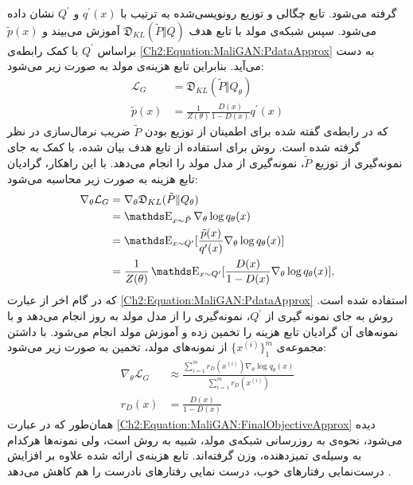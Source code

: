   گرفته می‌شود. 
تابع چگالی و توزیع رونویسی‌شده به ترتیب با
 $q^\prime (x)$
 و
  $Q^\prime$
  نشان داده می‌شود. سپس شبکه‌ی مولد با تابع هدف
  $\mathfrak{D}_{KL}(\tilde{P} \Vert Q)$
   آموزش می‌بیند و 
  $\tilde{p}(x)$
براساس
   $Q^{\prime}$
   با کمک رابطه‌ی 
   \ref{Ch2:Equation:MaliGAN:PdataApprox}
   به دست می‌آید. بنابراین تابع هزینه‌ی مولد به صورت زیر می‌شود:
\begin{equation}
\begin{split}
\mathcal{L}_G &= \mathfrak{D}_{KL}(\tilde{P} \Vert Q_\theta)\\
\tilde{p}(x)&=\frac{1}{Z(\theta)} \frac{D(x)}{1-D(x)} q^\prime(x)
\end{split}
\end{equation}
که در رابطه‌ی گفته شده برای اطمینان از توزیع بودن $\tilde{P}$ ضریب نرمال‌سازی در نظر گرفته شده است. 
\newline
روش
برای استفاده از تابع هدف بیان شده، با کمک
به جای نمونه‌گیری از توزیع
$\tilde{P}$،
نمونه‌گیری از مدل مولد را انجام می‌دهد. با این راهکار، گرادیان تابع هزینه به صورت زیر محاسبه می‌شود:
\begin{equation}\label{Ch2:Equation:MaliGAN:FinalObjective}
\begin{split}
\nabla_\theta \mathcal{L}_G &= \nabla_\theta \mathfrak{D}_{KL}(\tilde{P} \Vert Q_\theta) \\
&= \ME_{x \sim \tilde{P}} \nabla_\theta \log q_\theta(x) \\
&= \ME_{x \sim Q^\prime}[\frac{\tilde{p}(x)}{q^\prime(x)} \nabla_\theta \log q_\theta(x)] \\
&= \frac{1}{Z(\theta)} \ME_{x \sim Q^\prime} [\frac{D(x)}{1-D(x)} \nabla_\theta \log q_\theta(x)],
\end{split}
\end{equation}
که در گام اخر از عبارت
\ref{Ch2:Equation:MaliGAN:PdataApprox}
استفاده شده است. روش
 به جای نمونه گیری از 
$Q^\prime$،
نمونه‌گیری را از مدل مولد به روز انجام می‌دهد و با نمونه‌های آن گرادیان تابع هزینه را تخمین زده و آموزش مولد انجام می‌شود.
\newline
با داشتن مجموعه‌ی 
$\{ x^{(i)}  \}_1^m$
از نمونه‌های مولد، تخمین به صورت زیر می‌شود:
\begin{equation}\label{Ch2:Equation:MaliGAN:FinalObjectiveApprox}
\begin{split}
\nabla_\theta \mathcal{L}_G &\approx \frac
{\sum_{i=1}^m r_D(x^{(i)}) \nabla_\theta \log q_\theta(x)}
{\sum_{i=1}^m r_D(x^{(i)})}  \\
r_D(x) &= \frac{D(x)}{1-D(x)}
\end{split}
\end{equation}
همان‌طور که در عبارت
\ref{Ch2:Equation:MaliGAN:FinalObjectiveApprox}
دیده می‌شود، نحوه‌ی به روزرسانی شبکه‌ی مولد، شبیه به روش
است، ولی نمونه‌ها هرکدام به وسیله‌ی تمیزدهنده، وزن گرفته‌اند.
تابع هزینه‌ی ارائه شده علاوه بر افزایش درست‌نمایی رفتار‌های خوب، درست نمایی رفتارهای نادرست را هم کاهش می‌دهد
\cite{Che2017}.
  
